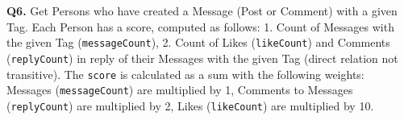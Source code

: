 \textbf{Q6.}
Get Persons who have created a Message (Post or Comment) with a given
Tag.
Each Person has a score, computed as follows: 1. Count of Messages with the given Tag (\texttt{messageCount}), 2. Count of Likes (\texttt{likeCount}) and Comments (\texttt{replyCount}) in reply of their Messages with the given Tag (direct relation not transitive).
The \texttt{score} is calculated as a sum with the following weights: Messages (\texttt{messageCount}) are multiplied by 1, Comments to Messages (\texttt{replyCount}) are multiplied by 2, Likes (\texttt{likeCount}) are multiplied by 10.

